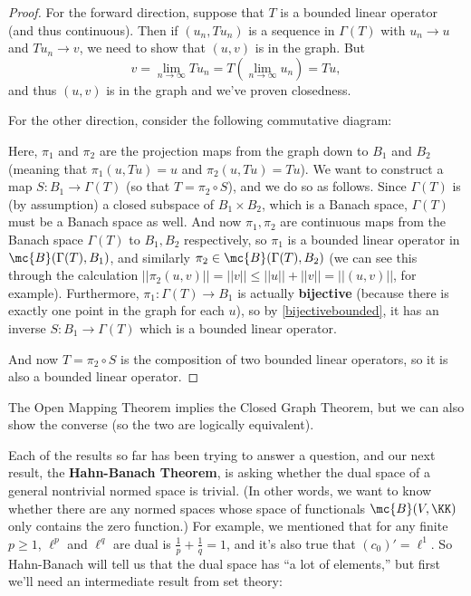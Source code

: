 \begin{proof}
For the forward direction, suppose that $T$ is a bounded linear operator (and thus continuous). Then if $(u_n, Tu_n)$ is a sequence in $\Gamma(T)$ with $u_n \to u$ and $Tu_n \to v$, we need to show that $(u, v)$ is in the graph. But 
\[
    v = \lim_{n \to \infty} Tu_n = T\left(\lim_{n \to \infty} u_n\right) = Tu,
\]
and thus $(u, v)$ is in the graph and we've proven closedness.

For the other direction, consider the following commutative diagram:
\begin{center}
\end{center}

Here, $\pi_1$ and $\pi_2$ are the projection maps from the graph down to $B_1$ and $B_2$ (meaning that $\pi_1(u, Tu) = u$ and $\pi_2(u, Tu) = Tu$). We want to construct a map $S: B_1 \to \Gamma(T)$ (so that $T = \pi_2 \circ S$), and we do so as follows. Since $\Gamma(T)$ is (by assumption) a closed subspace of $B_1 \times B_2$, which is a Banach space, $\Gamma(T)$ must be a Banach space as well. And now $\pi_1, \pi_2$ are continuous maps from the Banach space $\Gamma(T)$ to $B_1, B_2$ respectively, so $\pi_1$ is a bounded linear operator in $\mc{B}(\Gamma(T), B_1)$, and similarly $\pi_2 \in \mc{B}(\Gamma(T), B_2)$ (we can see this through the calculation $||\pi_2(u, v)|| = ||v|| \le ||u|| + ||v|| = ||(u, v)||$, for example). Furthermore, $\pi_1: \Gamma(T) \to B_1$ is actually \textbf{bijective} (because there is exactly one point in the graph for each $u$), so by \cref{bijectivebounded}, it has an inverse $S: B_1 \to \Gamma(T)$ which is a bounded linear operator.

And now $T = \pi_2 \circ S$ is the composition of two bounded linear operators, so it is also a bounded linear operator.
\end{proof}

\begin{remark}
The Open Mapping Theorem implies the Closed Graph Theorem, but we can also show the converse (so the two are logically equivalent).
\end{remark}

Each of the results so far has been trying to answer a question, and our next result, the \textbf{Hahn-Banach Theorem}, is asking whether the dual space of a general nontrivial normed space is trivial. (In other words, we want to know whether there are any normed spaces whose space of functionals $\mc{B}(V, \KK)$ only contains the zero function.) For example, we mentioned that for any finite $p \ge 1$, $\ell^p$ and $\ell^q$ are dual is $\frac{1}{p} + \frac{1}{q} = 1$, and it's also true that $(c_0)' = \ell^1$. So Hahn-Banach will tell us that the dual space has ``a lot of elements,'' but first we'll need an intermediate result from set theory:

